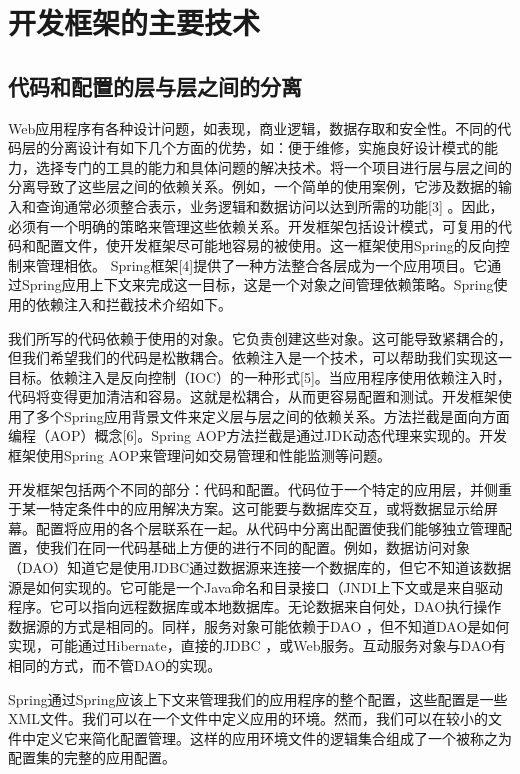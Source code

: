 
\chapter{开发框架的主要技术}
\section{代码和配置的层与层之间的分离}
Web应用程序有各种设计问题，如表现，商业逻辑，数据存取和安全性。不同的代码层的分离设计有如下几个方面的优势，如：便于维修，实施良好设计模式的能力，选择专门的工具的能力和具体问题的解决技术。将一个项目进行层与层之间的分离导致了这些层之间的依赖关系。例如，一个简单的使用案例，它涉及数据的输入和查询通常必须整合表示，业务逻辑和数据访问以达到所需的功能[3] 。因此，必须有一个明确的策略来管理这些依赖关系。开发框架包括设计模式，可复用的代码和配置文件，使开发框架尽可能地容易的被使用。这一框架使用Spring的反向控制来管理相依。 Spring框架[4]提供了一种方法整合各层成为一个应用项目。它通过Spring应用上下文来完成这一目标，这是一个对象之间管理依赖策略。Spring使用的依赖注入和拦截技术介绍如下。

我们所写的代码依赖于使用的对象。它负责创建这些对象。这可能导致紧耦合的，但我们希望我们的代码是松散耦合。依赖注入是一个技术，可以帮助我们实现这一目标。依赖注入是反向控制（IOC）的一种形式[5]。当应用程序使用依赖注入时，代码将变得更加清洁和容易。这就是松耦合，从而更容易配置和测试。开发框架使用了多个Spring应用背景文件来定义层与层之间的依赖关系。方法拦截是面向方面编程（AOP）概念[6]。Spring AOP方法拦截是通过JDK动态代理来实现的。开发框架使用Spring AOP来管理问如交易管理和性能监测等问题。

开发框架包括两个不同的部分：代码和配置。代码位于一个特定的应用层，并侧重于某一特定条件中的应用解决方案。这可能要与数据库交互，或将数据显示给屏幕。配置将应用的各个层联系在一起。从代码中分离出配置使我们能够独立管理配置，使我们在同一代码基础上方便的进行不同的配置。例如，数据访问对象（DAO）知道它是使用JDBC通过数据源来连接一个数据库的，但它不知道该数据源是如何实现的。它可能是一个Java命名和目录接口（JNDI上下文或是来自驱动程序。它可以指向远程数据库或本地数据库。无论数据来自何处，DAO执行操作数据源的方式是相同的。同样，服务对象可能依赖于DAO ，但不知道DAO是如何实现，可能通过Hibernate，直接的JDBC ，或Web服务。互动服务对象与DAO有相同的方式，而不管DAO的实现。

Spring通过Spring应该上下文来管理我们的应用程序的整个配置，这些配置是一些XML文件。我们可以在一个文件中定义应用的环境。然而，我们可以在较小的文件中定义它来简化配置管理。这样的应用环境文件的逻辑集合组成了一个被称之为配置集的完整的应用配置。

